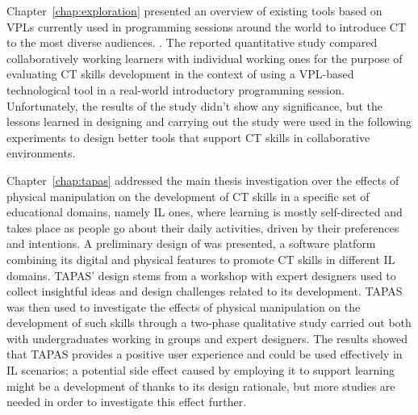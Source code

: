Chapter~\ref{chap:exploration} presented an overview of existing tools based on \acp{VPL} currently used in programming sessions around the world to introduce \ac{CT} to the most diverse audiences. . The reported quantitative study compared collaboratively working learners with individual working ones for the purpose of evaluating \ac{CT} skills development in the context of using a \ac{VPL}-based technological tool in a real-world introductory programming session. Unfortunately, the results of the study didn't show any significance, but the lessons learned in designing and carrying out the study were used in the following experiments to design better tools that support \ac{CT} skills in collaborative environments.

Chapter~\ref{chap:tapas} addressed the main thesis investigation over the effects of physical manipulation on the development of \ac{CT} skills in a specific set of educational domains, namely \ac{IL} ones, where learning is mostly self-directed and takes place as people go about their daily activities, driven by their preferences and intentions. A preliminary design of  was presented, a software platform combining its digital and physical features to promote \ac{CT} skills in different \ac{IL} domains. \ac{TAPAS}' design stems from a workshop with expert designers used to collect insightful ideas and design challenges related to its development. \ac{TAPAS} was then used to investigate the effects of physical manipulation on the development of such skills through a two-phase qualitative study carried out both with undergraduates working in groups and expert designers. The results showed that \ac{TAPAS} provides a positive user experience and could be used effectively in \ac{IL} scenarios; a potential side effect caused by employing it to support learning might be a development of  thanks to its design rationale, but more studies are needed in order to investigate this effect further.

